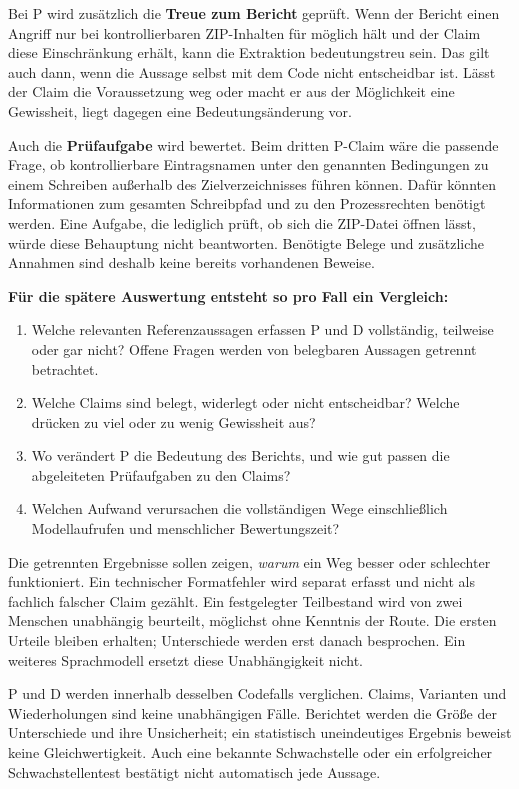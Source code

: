 \documentclass[10pt,a4paper]{article}
\begin{document}
Bei P wird zusätzlich die \textbf{Treue zum Bericht} geprüft. Wenn der Bericht einen Angriff nur bei kontrollierbaren ZIP-Inhalten für möglich hält und der Claim diese Einschränkung erhält, kann die Extraktion bedeutungstreu sein. Das gilt auch dann, wenn die Aussage selbst mit dem Code nicht entscheidbar ist. Lässt der Claim die Voraussetzung weg oder macht er aus der Möglichkeit eine Gewissheit, liegt dagegen eine Bedeutungsänderung vor.

Auch die \textbf{Prüfaufgabe} wird bewertet. Beim dritten P-Claim wäre die passende Frage, ob kontrollierbare Eintragsnamen unter den genannten Bedingungen zu einem Schreiben au\ss{}erhalb des Zielverzeichnisses führen können. Dafür könnten Informationen zum gesamten Schreibpfad und zu den Prozessrechten benötigt werden. Eine Aufgabe, die lediglich prüft, ob sich die ZIP-Datei öffnen lässt, würde diese Behauptung nicht beantworten. Benötigte Belege und zusätzliche Annahmen sind deshalb keine bereits vorhandenen Beweise.

\textbf{Für die spätere Auswertung entsteht so pro Fall ein Vergleich:}
\begin{enumerate}
\item Welche relevanten Referenzaussagen erfassen P und D vollständig, teilweise oder gar nicht? Offene Fragen werden von belegbaren Aussagen getrennt betrachtet.
\item Welche Claims sind belegt, widerlegt oder nicht entscheidbar? Welche drücken zu viel oder zu wenig Gewissheit aus?
\item Wo verändert P die Bedeutung des Berichts, und wie gut passen die abgeleiteten Prüfaufgaben zu den Claims?
\item Welchen Aufwand verursachen die vollständigen Wege einschlie\ss{}lich Modellaufrufen und menschlicher Bewertungszeit?
\end{enumerate}

Die getrennten Ergebnisse sollen zeigen, \emph{warum} ein Weg besser oder schlechter funktioniert. Ein technischer Formatfehler wird separat erfasst und nicht als fachlich falscher Claim gezählt. Ein festgelegter Teilbestand wird von zwei Menschen unabhängig beurteilt, möglichst ohne Kenntnis der Route. Die ersten Urteile bleiben erhalten; Unterschiede werden erst danach besprochen. Ein weiteres Sprachmodell ersetzt diese Unabhängigkeit nicht.

P und D werden innerhalb desselben Codefalls verglichen. Claims, Varianten und Wiederholungen sind keine unabhängigen Fälle. Berichtet werden die Grö\ss{}e der Unterschiede und ihre Unsicherheit; ein statistisch uneindeutiges Ergebnis beweist keine Gleichwertigkeit. Auch eine bekannte Schwachstelle oder ein erfolgreicher Schwachstellentest bestätigt nicht automatisch jede Aussage.
\end{document}
